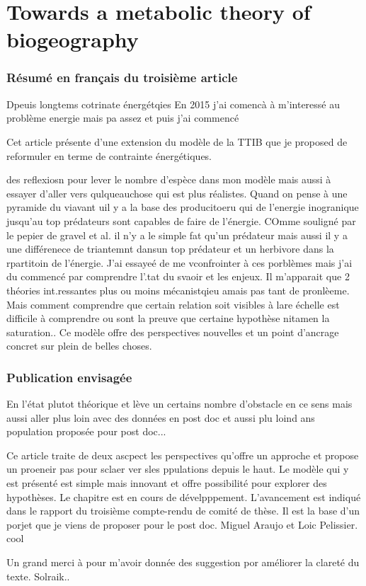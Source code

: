 \chapter{Towards a metabolic theory of biogeography}
\label{chap4}


\subsection{Résumé en français du troisième article}

Dpeuis longtems cotrinate énergétqies
En 2015 j'ai comencà à m'interessé au problème energie mais pa assez et puis j'ai commencé

Cet article présente d'une extension du modèle de la TTIB \citep{Gravel2011}
que je proposed de reformuler en terme de contrainte énergétiques.


des reflexiosn pour lever le nombre d'espèce dans mon modèle mais aussi à essayer d'aller vers qulqueauchose qui est plus réalistes.
Quand on pense à une pyramide du viavant uil y a la base des producitoeru qui de l'energie inogranique jusqu'au top prédateurs sont capables de faire de l'énergie.
COmme souligné par le pepier de gravel et al. il n'y a le simple fat qu'un prédateur mais aussi il y a une différenece de triantemnt dansun top prédateur et un herbivore dans la rpartitoin de l'énergie. J'ai essayeé de me vconfrointer à ces porblèmes mais j'ai du commencé par comprendre l'.tat du svaoir et les enjeux. Il m'apparait que 2 théories int.ressantes plus ou moins mécanistqieu amais pas tant de pronlèeme. Mais comment comprendre que certain relation soit visibles à lare échelle est difficile à comprendre ou sont la preuve que certaine hypothèse nitamen la saturation..
Ce modèle offre des perspectives nouvelles et un point d'ancrage concret sur plein de belles choses.



\subsection{Publication envisagée}

En l'état plutot théorique et lève un certains nombre d'obstacle en ce sens
mais aussi aller plus loin avec des données en post doc et aussi plu loind ans population
proposée pour post doc...

Ce article traite de deux ascpect les perspectives qu'offre un approche et propose un proeneir pas pour sclaer ver sles ppulations depuis le haut.
Le modèle qui y est présenté est simple mais innovant et offre possibilité pour explorer des hypothèses.
Le chapitre est en cours de dévelpppement. L'avancement est indiqué dans le rapport du troisième compte-rendu de comité de thèse.
Il est la base d'un porjet que je viens de proposer pour le post doc.
Miguel Araujo et Loic Pelissier. cool

Un grand merci à pour m'avoir donnée des suggestion por améliorer la clareté du texte. Solraik..
